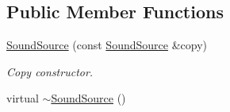 \subsection*{Public Member Functions}
\begin{DoxyCompactItemize}
\item 
\hyperlink{classsf_1_1_sound_source_ae0c7728c1449fdebe65749ab6fcb3170}{Sound\+Source} (const \hyperlink{classsf_1_1_sound_source}{Sound\+Source} \&copy)
\begin{DoxyCompactList}\small\item\em Copy constructor. \end{DoxyCompactList}\item 
\hypertarget{classsf_1_1_sound_source_a77c7c1524f8cb81df2de9375b0f87c5c}{virtual \hyperlink{classsf_1_1_sound_source_a77c7c1524f8cb81df2de9375b0f87c5c}{$\sim$\+Sound\+Source} ()}\label{classsf_1_1_sound_source_a77c7c1524f8cb81df2de9375b0f87c5c}


\end{DoxyCompactItemize}
